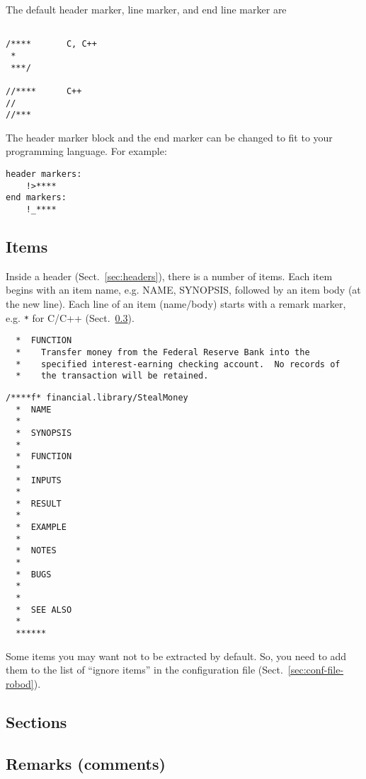 The default header marker, line marker, and end line marker are
\begin{verbatim}

/****       C, C++
 *
 ***/

//****      C++
//
//***
\end{verbatim}

The header marker block and the end marker can be changed to fit to
your programming language. For example:
\begin{verbatim}
header markers:
    !>****
end markers:
    !_****
\end{verbatim}



\subsection{Items}
\label{sec:items}

Inside a header (Sect.~\ref{sec:headers}), there is a number of items.
Each item begins with an item name, e.g. NAME, SYNOPSIS, followed by
an item body (at the new line). Each line of an item (name/body) starts with a
remark marker, e.g. \verb!*! for C/C++ (Sect.~\ref{sec:remarks-comments}).
\begin{verbatim}
  *  FUNCTION
  *    Transfer money from the Federal Reserve Bank into the
  *    specified interest-earning checking account.  No records of
  *    the transaction will be retained.
\end{verbatim}


\begin{verbatim}
/****f* financial.library/StealMoney
  *  NAME
  *
  *  SYNOPSIS
  *
  *  FUNCTION
  *
  *  INPUTS
  *
  *  RESULT
  *
  *  EXAMPLE
  *
  *  NOTES
  *
  *  BUGS
  *
  *
  *  SEE ALSO
  *
  ******
\end{verbatim}

Some items you may want not to be extracted by default. So, you need
to add them to the list of ``ignore items'' in the configuration file
(Sect.~\ref{sec:conf-file-robod}).


\subsection{Sections}
\label{sec:sections}

\subsection{Remarks (comments)}
\label{sec:remarks-comments}


